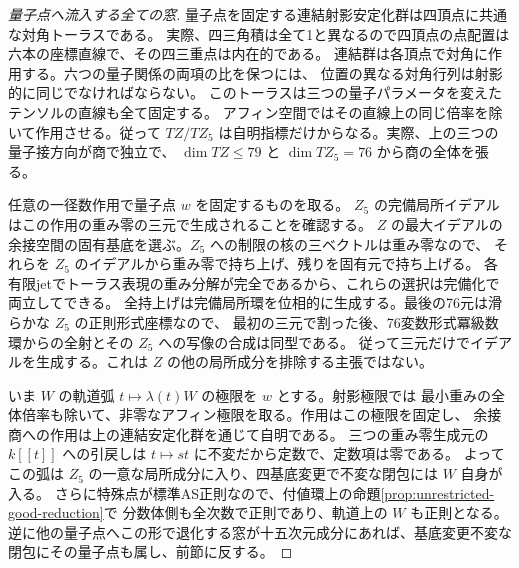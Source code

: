 \begin{proof}[量子点へ流入する全ての窓]
量子点を固定する連結射影安定化群は四頂点に共通な対角トーラスである。
実際、四三角積は全て1と異なるので四頂点の点配置は六本の座標直線で、その四三重点は内在的である。
連結群は各頂点で対角に作用する。六つの量子関係の両項の比を保つには、
位置の異なる対角行列は射影的に同じでなければならない。
このトーラスは三つの量子パラメータを変えたテンソルの直線も全て固定する。
アフィン空間ではその直線上の同じ倍率を除いて作用させる。従って
$T Z/T Z_5$ は自明指標だけからなる。実際、上の三つの量子接方向が商で独立で、
$\dim T Z\le79$ と $\dim T Z_5=76$ から商の全体を張る。

任意の一径数作用で量子点 $w$ を固定するものを取る。
$Z_5$ の完備局所イデアルはこの作用の重み零の三元で生成されることを確認する。
$Z$ の最大イデアルの余接空間の固有基底を選ぶ。$Z_5$ への制限の核の三ベクトルは重み零なので、
それらを $Z_5$ のイデアルから重み零で持ち上げ、残りを固有元で持ち上げる。
各有限jetでトーラス表現の重み分解が完全であるから、これらの選択は完備化で両立してできる。
全持上げは完備局所環を位相的に生成する。最後の76元は滑らかな $Z_5$ の正則形式座標なので、
最初の三元で割った後、76変数形式冪級数環からの全射とその $Z_5$ への写像の合成は同型である。
従って三元だけでイデアルを生成する。これは $Z$ の他の局所成分を排除する主張ではない。

いま $W$ の軌道弧 $t\mapsto\lambda(t)W$ の極限を $w$ とする。射影極限では
最小重みの全体倍率も除いて、非零なアフィン極限を取る。作用はこの極限を固定し、
余接商への作用は上の連結安定化群を通じて自明である。
三つの重み零生成元の $k[[t]]$ への引戻しは $t\mapsto st$ に不変だから定数で、定数項は零である。
よってこの弧は $Z_5$ の一意な局所成分に入り、四基底変更で不変な閉包には $W$ 自身が入る。
さらに特殊点が標準AS正則なので、付値環上の命題\ref{prop:unrestricted-good-reduction}で
分数体側も全次数で正則であり、軌道上の $W$ も正則となる。
逆に他の量子点へこの形で退化する窓が十五次元成分にあれば、基底変更不変な閉包にその量子点も属し、前節に反する。
\end{proof}


